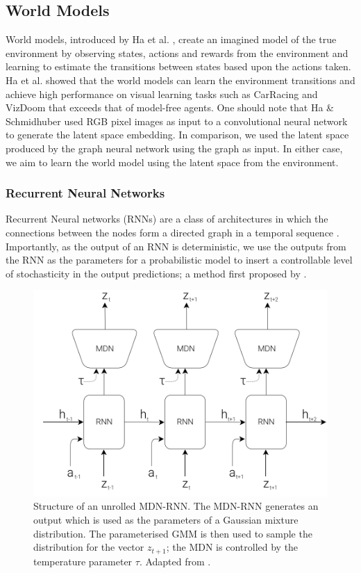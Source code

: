 \subsection{World Models}
World models, introduced by Ha et al. \cite{ha2018worldmodels}, create an imagined model of the true environment by observing states, actions and rewards from the environment and learning to estimate the transitions between states based upon the actions taken. Ha et al. showed that the world models can learn the environment transitions and achieve high performance on visual learning tasks such as CarRacing and VizDoom that exceeds that of model-free agents. One should note that Ha \& Schmidhuber used RGB pixel images as input to a convolutional neural network to generate the latent space embedding. In comparison, we used the latent space produced by the graph neural network using the graph as input. In either case, we aim to learn the world model using the latent space from the environment.




\subsubsection{Recurrent Neural Networks}
\label{sec:rlopt:subsec:rnn}

Recurrent Neural networks (RNNs) are a class of architectures in which the connections between the nodes form a directed graph in a temporal sequence \cite{650093}. Importantly, as the output of an RNN is deterministic, we use the outputs from the RNN as the parameters for a probabilistic model to insert a controllable level of stochasticity in the output predictions; a method first proposed by \citet{graves2014generating}.

\begin{figure}[ht]
  \centering
  \includegraphics[width=0.75\columnwidth]{sections/4rlopt/images/mdnrnn.png}
  \caption[Temporally unrolled MDN-RNN]{Structure of an unrolled MDN-RNN. The MDN-RNN generates an output which is used as the parameters of a Gaussian mixture distribution. The parameterised GMM is then used to sample the distribution for the vector $z_{t+1}$; the MDN is controlled by the temperature parameter $\tau$. Adapted from \cite{ha2018worldmodels}.}
  \label{fig:rl:mdnrnn}
\end{figure}

